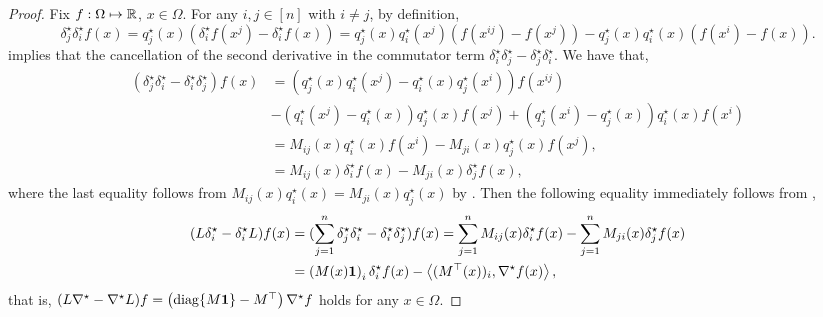 \begin{proof}
    
    
    Fix $f: \Omega\mapsto \mathbb{R}$, $x\in \Omega$.
    For any $i,j \in [n]$ with $i\neq j$, by definition,
    $$
        \delta^\star_j \delta^\star_i f(x) = q^\star_j(x) (\delta^\star_i f(x^j) - \delta^\star_i f(x)) = q^\star_j(x) q^\star_i(x^j)(f(x^{ij})-f(x^j)) - q^\star_j(x)q^\star_i(x)(f(x^i)-f(x)).
    $$
     implies that the cancellation of the second derivative in the commutator term $\delta^\star_i\delta^\star_j - \delta^\star_j\delta^\star_i$. 
    We have that,
    \begin{align}
        (\delta^\star_j \delta^\star_i - \delta^\star_i \delta^\star_j) f(x) &= (q_j^\star(x)q_i^\star(x^j) - q_i^\star(x)q_j^\star(x^i)) f(x^{ij})  \nonumber
        \\&-(q_i^\star(x^j) - q_i^\star(x))q_j^\star(x)f(x^j)+(q_j^\star(x^i) - q_j^\star(x))q_i^\star(x)f(x^i) \nonumber
        \\&= M_{ij}(x)q_i^\star(x)f(x^i) - M_{ji}(x)q_j^\star(x)f(x^j), \nonumber
        \\&= M_{ij}(x)\delta^\star_i f(x) - M_{ji}(x)\delta^\star_j f(x), \label{eq:commutator_delta_ij}
    \end{align}
    where the last equality follows from $M_{ij}(x) q_i^\star(x) = M_{ji}(x) q_j^\star(x)$ by .
    Then the following equality immediately follows from
    ,
    \begin{align}
        (L\delta^\star_i - \delta^\star_iL) f(x) &= (\sum_{j=1}^n \delta^\star_j\delta^\star_i - \delta^\star_i\delta^\star_j)f(x)
        = \sum_{j=1}^n M_{ij}(x)\delta^\star_i f(x) - \sum_{j=1}^n M_{ji}(x)\delta^\star_j f(x) \nonumber
        \\&= \left(M(x)\boldsymbol{1}\right)_i\delta^\star_i f(x) - \left\langle (M^\top(x))_i,\nabla^\star f(x)\right\rangle, \nonumber
    \end{align}
    that is, $(L \nabla^\star - \nabla^\star L) f = \left( \mathrm{diag}\{M\boldsymbol{1}\} - M^\top \right) \nabla^\star f$ holds for any $x\in \Omega$.
\end{proof}




